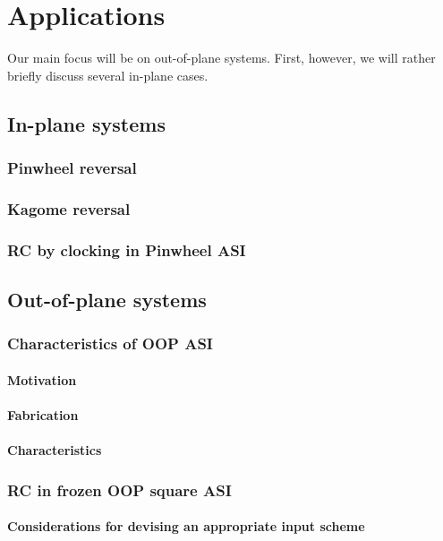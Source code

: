 \chapter{Applications}\label{ch:Applications}

Our main focus will be on out-of-plane systems. First, however, we will rather briefly discuss several in-plane cases.

\section{In-plane systems}
\subsection{Pinwheel reversal}\label{sec:3:IP_Pinwheel_reversal}
\subsection{Kagome reversal}
\subsection{RC by clocking in Pinwheel ASI}

\section{Out-of-plane systems}
\subsection{Characteristics of OOP ASI}
\subsubsection{Motivation} %
\subsubsection{Fabrication} %
\subsubsection{Characteristics} %

\subsection{RC in frozen OOP square ASI}
\subsubsection{Considerations for devising an appropriate input scheme}
